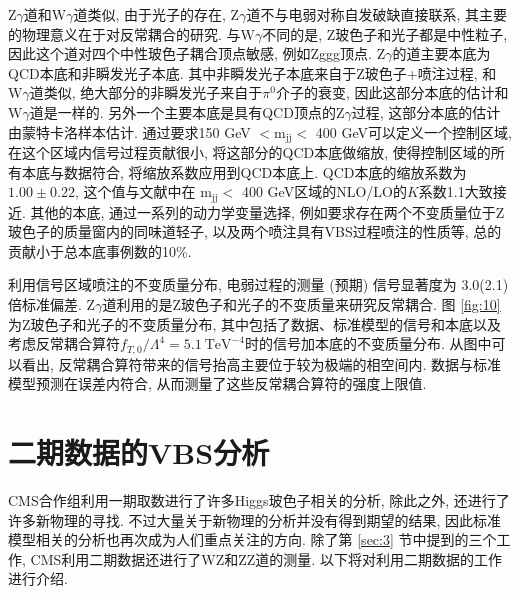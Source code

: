 \documentclass{SCIS2020cn}
\newcommand{\Wboson}{\text{W}}
\newcommand{\Zboson}{\text{Z}}
\newcommand{\mass}{\text{m}}
\begin{document}
$\Zboson\gamma$道和$\Wboson\gamma$道类似, 由于光子的存在, $\Zboson\gamma$道不与电弱对称自发破缺直接联系, 其主要的物理意义在于对反常耦合的研究. 与$\Wboson\gamma$不同的是, Z玻色子和光子都是中性粒子, 因此这个道对四个中性玻色子耦合顶点敏感, 例如Zggg顶点. $\Zboson\gamma$的道主要本底为QCD本底和非瞬发光子本底. 其中非瞬发光子本底来自于Z玻色子+喷注过程, 和$\Wboson\gamma$道类似, 绝大部分的非瞬发光子来自于$\pi^0$介子的衰变, 因此这部分本底的估计和$\Wboson\gamma$道是一样的. 另外一个主要本底是具有QCD顶点的$\Zboson\gamma$过程, 这部分本底的估计由蒙特卡洛样本估计. 通过要求150 GeV $< \mass_{\text{jj}} < $ 400 GeV可以定义一个控制区域, 在这个区域内信号过程贡献很小, 将这部分的QCD本底做缩放, 使得控制区域的所有本底与数据符合, 将缩放系数应用到QCD本底上. QCD本底的缩放系数为$1.00\pm0.22$, 这个值与文献中在 $\mass_{\text{jj}} <$ 400 GeV区域的NLO/LO的$K$系数1.1大致接近. 其他的本底, 通过一系列的动力学变量选择, 例如要求存在两个不变质量位于$\Zboson$玻色子的质量窗内的同味道轻子, 以及两个喷注具有VBS过程喷注的性质等, 总的贡献小于总本底事例数的10\%. 

利用信号区域喷注的不变质量分布, 电弱过程的测量 (预期) 信号显著度为 3.0(2.1) 倍标准偏差. $\Zboson\gamma$道利用的是Z玻色子和光子的不变质量来研究反常耦合. 图 \ref{fig:10} 为Z玻色子和光子的不变质量分布, 其中包括了数据、标准模型的信号和本底以及考虑反常耦合算符$f_{T,0}/\Lambda^4=5.1\ \text{TeV}^{-4}$时的信号加本底的不变质量分布. 从图中可以看出, 反常耦合算符带来的信号抬高主要位于较为极端的相空间内. 数据与标准模型预测在误差内符合, 从而测量了这些反常耦合算符的强度上限值.

\section{二期数据的VBS分析}

CMS合作组利用一期取数进行了许多Higgs玻色子相关的分析, 除此之外, 还进行了许多新物理的寻找. 不过大量关于新物理的分析并没有得到期望的结果, 因此标准模型相关的分析也再次成为人们重点关注的方向. 除了第 \ref{sec:3} 节中提到的三个工作, CMS利用二期数据还进行了WZ和ZZ道的测量. 以下将对利用二期数据的工作进行介绍. 
\end{document}
